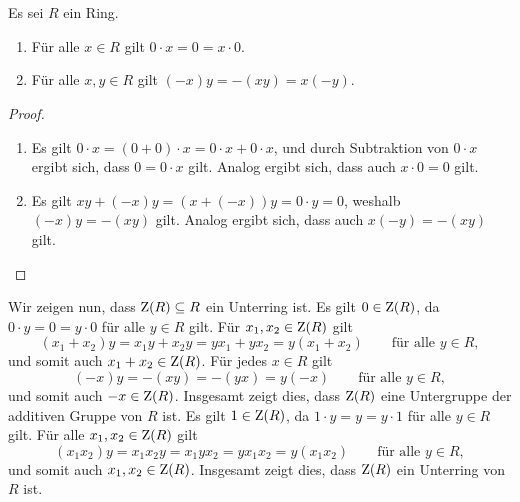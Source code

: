 \section{}





\subsection{}

\begin{lemma}
  Es sei $R$ ein Ring.
  \begin{enumerate}
    \item
      Für alle $x \in R$ gilt $0 \cdot x = 0 = x \cdot 0$.
    \item
      Für alle $x, y \in R$ gilt $(-x)y = -(xy) = x(-y)$.
  \end{enumerate}
\end{lemma}

\begin{proof}
  \begin{enumerate}
    \item
      Es gilt $0 \cdot x= (0 + 0) \cdot x  = 0 \cdot x + 0 \cdot x$, und durch Subtraktion von $0 \cdot x$ ergibt sich, dass $0 = 0 \cdot x$ gilt.
      Analog ergibt sich, dass auch $x \cdot 0 = 0$ gilt.
    \item
      Es gilt $xy + (-x)y = (x + (-x))y = 0 \cdot y = 0$, weshalb $(-x)y = -(xy)$ gilt.
      Analog ergibt sich, dass auch $x(-y) = -(xy)$ gilt.
    \qedhere
  \end{enumerate}
\end{proof}

Wir zeigen nun, dass $\operatorname{Z}(R) \subseteq R$ ein Unterring ist.
Es gilt $0 \in \operatorname{Z}(R)$, da $0 \cdot y = 0 = y \cdot 0$ für alle $y \in R$ gilt.
Für $x_1, x_2 \in \operatorname{Z}(R)$ gilt
\[
    (x_1 + x_2) y
  = x_1 y + x_2 y
  = y x_1 + y x_2
  = y (x_1 + x_2) 
  \qquad
  \text{für alle $y \in R$},
\]
und somit auch $x_1 + x_2 \in \operatorname{Z}(R)$.
Für jedes $x \in R$ gilt
\[
    (-x) y
  = -(xy)
  = -(yx)
  = y (-x)
  \qquad
  \text{für alle $y \in R$},
\]
und somit auch $-x \in \operatorname{Z}(R)$.
Insgesamt zeigt dies, dass $\operatorname{Z}(R)$ eine Untergruppe der additiven Gruppe von $R$ ist.
Es gilt $1 \in \operatorname{Z}(R)$, da $1 \cdot y = y = y \cdot 1$ für alle $y \in R$ gilt.
Für alle $x_1, x_2 \in \operatorname{Z}(R)$ gilt
\[
    (x_1 x_2) y
  = x_1 x_2 y
  = x_1 y x_2
  = y x_1 x_2
  = y (x_1 x_2)
  \qquad
  \text{für alle $y \in R$},
\]
und somit auch $x_1, x_2 \in \operatorname{Z}(R)$.
Insgesamt zeigt dies, dass $\operatorname{Z}(R)$ ein Unterring von $R$ ist.

